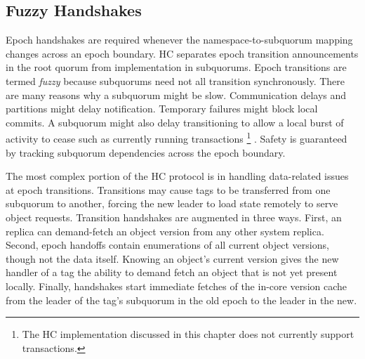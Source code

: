 \subsection{Fuzzy Handshakes}
\label{ch03_fuzzy_transitions}

Epoch handshakes are required whenever the namespace-to-subquorum mapping changes across an epoch boundary.
HC separates epoch transition announcements in the root quorum from implementation in subquorums.
Epoch transitions are termed \emph{fuzzy} because subquorums need not all transition synchronously.
There are many reasons why a subquorum might be slow.
Communication delays and partitions might delay notification.
Temporary failures might block local commits.
A subquorum might also delay transitioning to allow a local burst of activity to cease such as currently running transactions\renewcommand{\baselinestretch}{1} \small\footnotesize\footnote{The HC implementation discussed in this chapter does not currently support transactions.}\renewcommand{\baselinestretch}{2} \small\normalsize.
Safety is guaranteed by tracking subquorum dependencies across the epoch boundary.

The most complex portion of the HC protocol is in handling data-related issues at epoch transitions.
Transitions may cause tags to be transferred from one subquorum to another, forcing the new leader to load state remotely to serve object requests.
Transition handshakes are augmented in three ways.
First, an replica can demand-fetch an object version from any other system replica.
Second, epoch handoffs contain enumerations of all current object versions, though not the data itself.
Knowing an object's current version gives the new handler of a tag the ability to demand fetch an object that is not yet present locally.
Finally, handshakes start immediate fetches of the in-core version cache from the leader of the tag's subquorum in the old epoch to the leader in the new.

